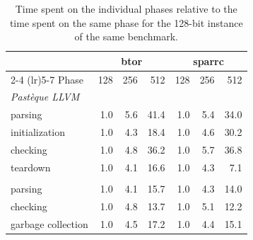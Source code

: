 \begin{table}[htbp]
  \centering
  \caption{Time spent on the individual phases relative to the time spent on the same phase for the 128-bit instance of the same benchmark.}
  \label{tab:phase-scaling}
  \begin{tabular}{l rrr rrr}
    \toprule
    & \multicolumn{3}{c}{btor} & \multicolumn{3}{c}{sparrc} \\
    \cmidrule(lr){2-4} \cmidrule(lr){5-7}
    Phase & 128 & 256 & 512 & 128 & 256 & 512 \\
    \midrule
    \multicolumn{7}{l}{\emph{Pastèque LLVM}} \\
    \quad parsing & 1.0 & 5.6 & 41.4 & 1.0 & 5.4 & 34.0 \\
    \quad initialization & 1.0 & 4.3 & 18.4 & 1.0 & 4.6 & 30.2 \\
    \quad checking & 1.0 & 4.8 & 36.2 & 1.0 & 5.7 & 36.8 \\
    \quad teardown & 1.0 & 4.1 & 16.6 & 1.0 & 4.3 & 7.1 \\
    \addlinespace
    \multicolumn{7}{l}{\emph{Pastèque SML}} \\
    \quad parsing & 1.0 & 4.1 & 15.7 & 1.0 & 4.3 & 14.0 \\
    \quad checking & 1.0 & 4.8 & 13.7 & 1.0 & 5.1 & 12.2 \\
    \quad garbage collection & 1.0 & 4.5 & 17.2 & 1.0 & 4.4 & 15.1 \\
    \bottomrule
  \end{tabular}
\end{table}
